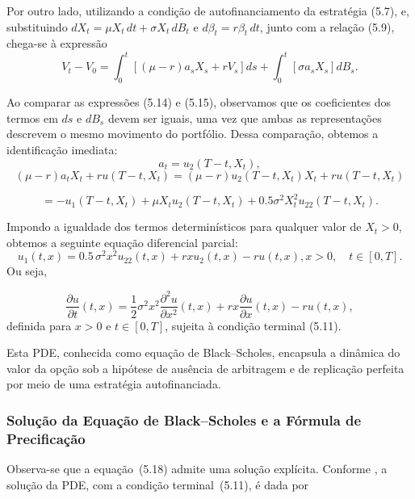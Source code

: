 \documentclass[12pt,openright,oneside,a4paper]{abntex2}
\numberwithin{equation}{section}
\begin{document}
Por outro lado, utilizando a condição de autofinanciamento da estratégia (5.7),
e, substituindo $dX_t = \mu X_t\, dt + \sigma X_t\, dB_t$ e $d\beta_t = r\beta_t\, dt$, junto com a relação (5.9), chega-se à expressão
\begin{equation}
    V_t - V_0 = \int_0^t \left[(\mu - r) a_s X_s + r V_s\right] ds + \int_0^t \left[\sigma a_s X_s\right] dB_s. 
\end{equation}

Ao comparar as expressões (5.14) e (5.15), observamos que os coeficientes dos termos em $ds$ e $dB_s$ devem ser iguais, uma vez que ambas as representações descrevem o mesmo movimento do portfólio. Dessa comparação, obtemos a identificação imediata:
\begin{equation}
    a_t = u_2(T - t, X_t), 
\end{equation}
\[
(\mu - r) a_t X_t + r u(T - t, X_t) = (\mu - r) u_2(T - t, X_t) X_t + r u(T - t, X_t)
\]

\[
= -u_1(T - t, X_t) + \mu X_t u_2(T - t, X_t) + 0.5 \sigma^2 X_t^2 u_{22}(T - t, X_t).
\]

Impondo a igualdade dos termos determinísticos para qualquer valor de $X_t > 0$, obtemos a seguinte equação diferencial parcial:
\begin{equation}
    u_1(t, x) = 0.5 \, \sigma^2 x^2 u_{22}(t, x) + r x u_2(t, x) - r u(t, x), 
 x > 0,\quad t \in [0, T].
\end{equation}
Ou seja, 


\begin{equation}
    \frac{\partial u}{\partial t}(t,x) = \frac{1}{2}\sigma^2 x^2 \frac{\partial^2 u}{\partial x^2}(t,x) + r x \frac{\partial u}{\partial x}(t,x) - r u(t,x),
\end{equation}
definida para $x > 0$ e $t \in [0,T]$, sujeita à condição terminal (5.11).

Esta PDE, conhecida como equação de Black--Scholes, encapsula a dinâmica do valor da opção sob a hipótese de ausência de arbitragem e de replicação perfeita por meio de uma estratégia autofinanciada.

\subsubsection{Solução da Equação de Black--Scholes e a Fórmula de Precificação}

Observa-se que a equação~(5.18) admite uma solução explícita. Conforme \textcite[p.~174]{Mikosh}, a solução da PDE, com a condição terminal~(5.11), é dada por
\end{document}
